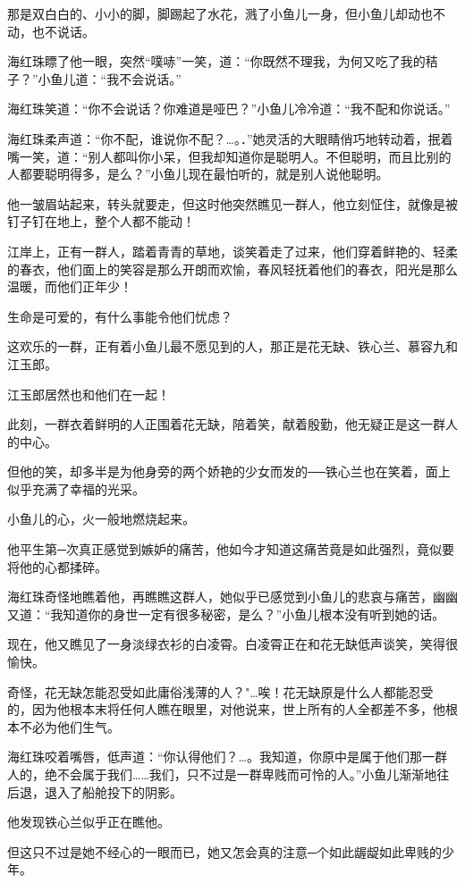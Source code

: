 \documentclass[12pt,oneside]{book}
\begin{document}
那是双白白的、小小的脚，脚踢起了水花，溅了小鱼儿一身，但小鱼儿却动也不动，也不说话。

海红珠瞟了他一眼，突然``噗哧''一笑，道：``你既然不理我，为何又吃了我的秸子？''小鱼儿道：``我不会说话。''

海红珠笑道：``你不会说话？你难道是哑巴？''小鱼儿冷冷道：``我不配和你说话。''

海红珠柔声道：``你不配，谁说你不配？\ldots。．''她灵活的大眼睛俏巧地转动着，抿着嘴一笑，道：``别人都叫你小呆，但我却知道你是聪明人。不但聪明，而且比别的人都要聪明得多，是么？''小鱼儿现在最怕听的，就是别人说他聪明。

他一皱眉站起来，转头就要走，但这时他突然瞧见一群人，他立刻怔住，就像是被钉子钉在地上，整个人都不能动！

江岸上，正有一群人，踏着青青的草地，谈笑着走了过来，他们穿着鲜艳的、轻柔的春衣，他们面上的笑容是那么开朗而欢愉，春风轻抚着他们的春衣，阳光是那么温暖，而他们正年少！

生命是可爱的，有什么事能令他们忧虑？

这欢乐的一群，正有着小鱼儿最不愿见到的人，那正是花无缺、铁心兰、慕容九和江玉郎。

江玉郎居然也和他们在一起！

此刻，一群衣着鲜明的人正围着花无缺，陪着笑，献着殷勤，他无疑正是这一群人的中心。

但他的笑，却多半是为他身旁的两个娇艳的少女而发的──铁心兰也在笑着，面上似乎充满了幸福的光采。

小鱼儿的心，火一般地燃烧起来。

他平生第─次真正感觉到嫉妒的痛苦，他如今才知道这痛苦竟是如此强烈，竟似要将他的心都揉碎。

海红珠奇怪地瞧着他，再瞧瞧这群人，她似乎已感觉到小鱼儿的悲哀与痛苦，幽幽又道：``我知道你的身世一定有很多秘密，是么？''小鱼儿根本没有听到她的话。

现在，他又瞧见了一身淡绿衣衫的白凌霄。白凌霄正在和花无缺低声谈笑，笑得很愉快。

奇怪，花无缺怎能忍受如此庸俗浅薄的人？"\ldots 唉！花无缺原是什么人都能忍受的，因为他根本末将任何人瞧在眼里，对他说来，世上所有的人全都差不多，他根本不必为他们生气。

海红珠咬着嘴唇，低声道：``你认得他们？\ldots。我知道，你原中是属于他们那一群人的，绝不会属于我们\ldots\ldots 我们，只不过是一群卑贱而可怜的人。''小鱼儿渐渐地往后退，退入了船舱投下的阴影。

他发现铁心兰似乎正在瞧他。

但这只不过是她不经心的一眼而已，她又怎会真的注意─个如此龌龊如此卑贱的少年。
\end{document}
